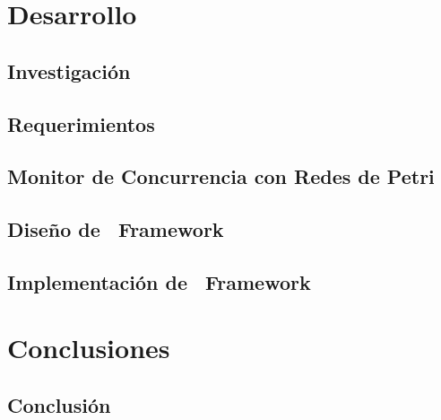 \documentclass{report}
\begin{document}
    \part{Desarrollo}
        \chapter{Investigación}
            \label{cap:investigacion}
            
        \chapter{Requerimientos}
            
        \chapter{Monitor de Concurrencia con Redes de Petri}
        	\label{cap:petri_monitor}
            
            
            

        \chapter{Diseño de \nombreFramework \ Framework}
        	\label{cap:diseno_framework}
        	
            
            
            
            
            
        \chapter{Implementación de \nombreFramework \ Framework}
            

    \part{Conclusiones}
        \chapter{Conclusión}
            
\end{document}
